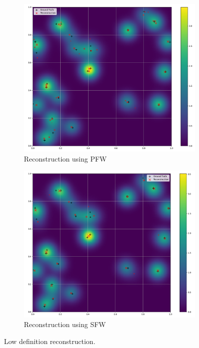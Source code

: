 \documentclass[a4paper,12pt,oneside]{report}
\theoremstyle{named}
\begin{document}
\begin{figure}
\centering
\begin{subfigure}[b]{1\textwidth}
   \hspace*{1cm}\includegraphics[width=0.8\linewidth]{pfw_2d.png}
   \caption{Reconstruction using PFW}
   \label{fig:pfw_2d} 
\end{subfigure}

\begin{subfigure}[b]{1\textwidth}
   \hspace*{1cm}\includegraphics[width=0.8\linewidth]{sfw_2d.png}
   \caption{Reconstruction using SFW}
   \label{fig:sfw_2d}
\end{subfigure}

\caption{Low definition reconstruction.}
\label{fig:PFWvsSFW_2d}
\end{figure}
\end{document}
